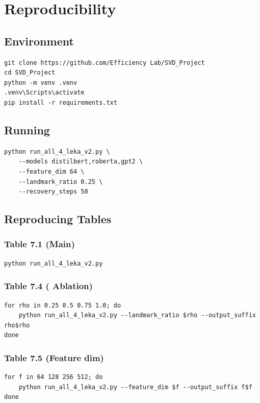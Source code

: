 \section{Reproducibility}

\subsection{Environment}

\begin{lstlisting}
git clone https://github.com/Efficiency Lab/SVD_Project
cd SVD_Project
python -m venv .venv
.venv\Scripts\activate
pip install -r requirements.txt
\end{lstlisting}

\subsection{Running}

\begin{lstlisting}
python run_all_4_leka_v2.py \
    --models distilbert,roberta,gpt2 \
    --feature_dim 64 \
    --landmark_ratio 0.25 \
    --recovery_steps 50
\end{lstlisting}

\subsection{Reproducing Tables}

\subsubsection{Table 7.1 (Main)}
\begin{lstlisting}
python run_all_4_leka_v2.py
\end{lstlisting}

\subsubsection{Table 7.4 (  Ablation)}
\begin{lstlisting}
for rho in 0.25 0.5 0.75 1.0; do
    python run_all_4_leka_v2.py --landmark_ratio $rho --output_suffix rho$rho
done
\end{lstlisting}

\subsubsection{Table 7.5 (Feature dim)}
\begin{lstlisting}
for f in 64 128 256 512; do
    python run_all_4_leka_v2.py --feature_dim $f --output_suffix f$f
done
\end{lstlisting}

